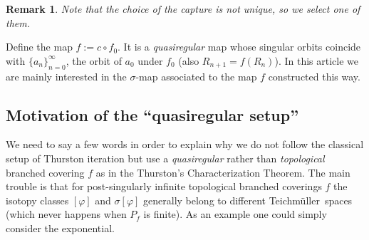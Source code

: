 \documentclass[10pt,reqno,a4paper]{amsart}
\numberwithin{figure}{section}
\numberwithin{equation}{section}
\newtheorem{remark}[thm]{Remark}
\newcommand{\tei}{Teichm\"uller}
\begin{document}
\begin{remark}
	Note that the choice of the capture is not unique, so we select one of them.
\end{remark}

Define the map $f:=c\circ f_0$. It is a \emph{quasiregular} map whose singular orbits coincide with $\{a_{n}\}_{n=0}^\infty$, the orbit of $a_0$ under $f_0$ (also $R_{n+1}=f(R_n)$). In this article we are mainly interested in the $\sigma$-map associated to the map $f$ constructed this way.

\subsection{Motivation of the ``quasiregular setup''} 
\label{subsec:top_exp_fails}

We need to say a few words in order to explain why we do not follow the classical setup of Thurston iteration but use a \emph{quasiregular} rather than \emph{topological} branched covering $f$ as in the Thurston's Characterization Theorem. The main trouble is that for post-singularly infinite topological branched coverings $f$ the isotopy classes $[\varphi]$ and $\sigma[\varphi]$ generally belong to different \tei\ spaces (which never happens when $P_f$ is finite). As an example one could simply consider the exponential.
\end{document}
